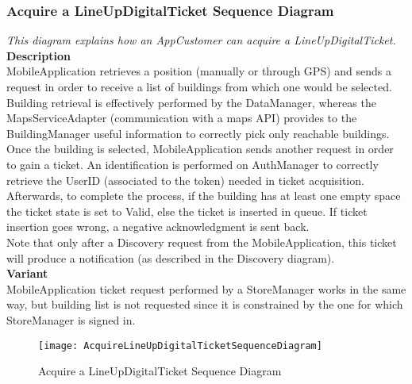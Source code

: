 \subsubsection{ Acquire a LineUpDigitalTicket Sequence Diagram}
\textit{This diagram explains how an AppCustomer can acquire a LineUpDigitalTicket.\\}
\textbf{Description\\}
MobileApplication retrieves a position (manually or through GPS) and sends a request in order to receive a list of buildings from which one would be selected. Building retrieval is effectively performed by the DataManager, whereas the MapsServiceAdapter (communication with a maps API) provides to the BuildingManager useful information to correctly pick only reachable buildings.\\
Once the building is selected, MobileApplication sends another request in order to gain a ticket. An identification is performed on AuthManager to correctly retrieve the UserID (associated to the token) needed in ticket acquisition. Afterwards, to complete the process, if the building has at least one empty space the ticket state is set to Valid, else the ticket is inserted in queue.
If ticket insertion goes wrong, a negative acknowledgment is sent back.\\
Note that only after a Discovery request from the MobileApplication, this ticket will produce a notification (as described in the Discovery diagram).\\
\textbf{Variant\\}
MobileApplication ticket request performed by a StoreManager works in the same way, but building list is not requested since it is constrained by the one for which StoreManager is signed in. \\

\begin{figure}[H]
 \centering
 \texttt{[image: AcquireLineUpDigitalTicketSequenceDiagram]}
 \caption{ Acquire a LineUpDigitalTicket Sequence Diagram}
 \end{figure}

\newpage
